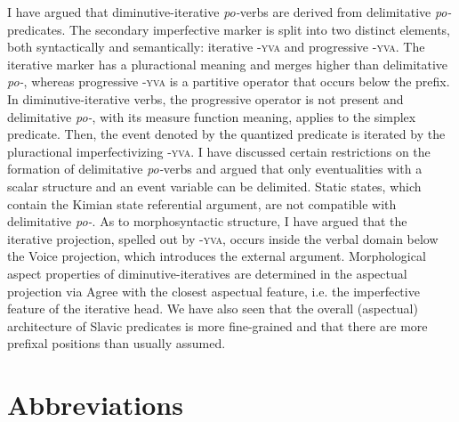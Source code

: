 \documentclass[output=paper,colorlinks,citecolor=brown]{langscibook}
\begin{document}
I have argued that diminutive-iterative \textit{po-}verbs are derived from delimitative \textit{po-}predicates. The secondary imperfective marker is split into two distinct elements, both syntactically and semantically: iterative \textsc{-yva} and progressive \textsc{-yva}. The iterative marker has a pluractional meaning and merges higher than delimitative \textit{po-}, whereas progressive \textsc{-yva} is a partitive operator that occurs below the prefix. In diminutive-iterative verbs, the progressive operator is not present and delimitative \textit{po-}, with its measure function meaning, applies to the simplex predicate. Then, the event denoted by the quantized predicate is iterated by the pluractional imperfectivizing \textsc{-yva}. I have discussed certain restrictions on the formation of delimitative \textit{po-}verbs and argued that only eventualities with a scalar structure and an event variable can be delimited. Static states, which contain the Kimian state referential argument, are not compatible with delimitative \textit{po-}. As to morphosyntactic structure, I have argued that the iterative projection, spelled out by \textsc{-yva}, occurs inside the verbal domain below the Voice projection, which introduces the external argument. Morphological aspect properties of diminutive-iteratives are determined in the aspectual projection via Agree with the closest aspectual feature, i.e. the imperfective feature of the iterative head. We have also seen that the overall (aspectual) architecture of Slavic predicates is more fine-grained and that there are more prefixal positions than usually assumed.

\section*{Abbreviations}
\end{document}

